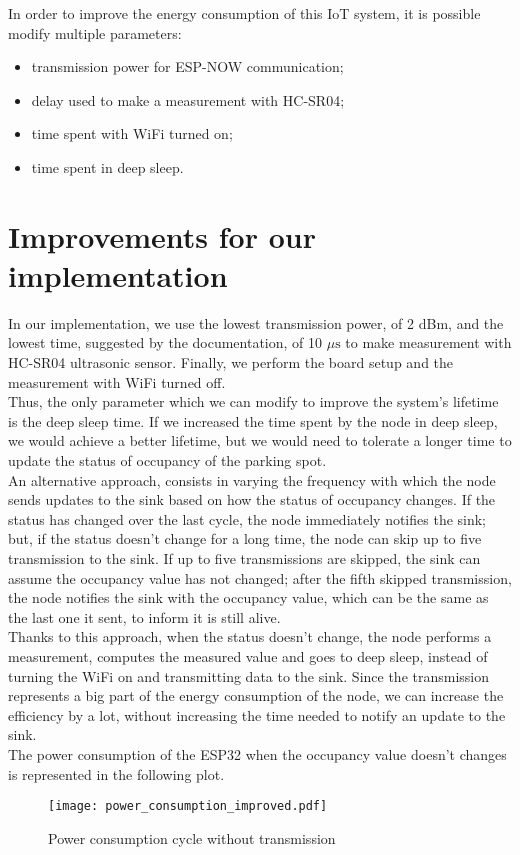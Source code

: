In order to improve the energy consumption of this IoT system, it is possible modify multiple parameters:
\begin{itemize}
	\item transmission power for ESP-NOW communication;
	\item delay used to make a measurement with HC-SR04;
	\item time spent with WiFi turned on;
	\item time spent in deep sleep.
\end{itemize}

\section{Improvements for our implementation}
In our implementation, we use the lowest transmission power, of 2 dBm, and the lowest time, suggested by the documentation, of 10 $\mu \text{s}$ to make measurement with HC-SR04 ultrasonic sensor. Finally, we perform the board setup and the measurement with WiFi turned off.\\
Thus, the only parameter which we can modify to improve the system's lifetime is the deep sleep time. If we increased the time spent by the node in deep sleep, we would achieve a better lifetime, but we would need to tolerate a longer time to update the status of occupancy of the parking spot.\\
An alternative approach, consists in varying the frequency with which the node sends updates to the sink based on how the status of occupancy changes. If the status has changed over the last cycle, the node immediately notifies the sink; but, if the status doesn't change for a long time, the node can skip up to five transmission to the sink. If up to five transmissions are skipped, the sink can assume the occupancy value has not changed; after the fifth skipped transmission, the node notifies the sink with the occupancy value, which can be the same as the last one it sent, to inform it is still alive.\\
Thanks to this approach, when the status doesn't change, the node performs a measurement, computes the measured value and goes to deep sleep, instead of turning the WiFi on and transmitting data to the sink. Since the transmission represents a big part of the energy consumption of the node, we can increase the efficiency by a lot, without increasing the time needed to notify an update to the sink.\\

The power consumption of the ESP32 when the occupancy value doesn't changes is represented in the following plot.
\begin{figure}[H]
    \centering
    \texttt{[image: power\_consumption\_improved.pdf]}
    \caption{Power consumption cycle without transmission}
    \label{fig:Power consumption cycle without transmission}
\end{figure}

